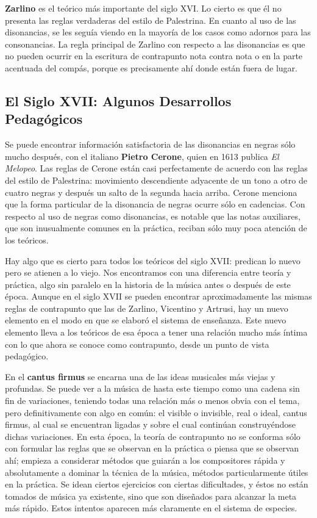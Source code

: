 \documentclass[letterpaper,12pt]{book}
\theoremstyle{definition} \newtheorem{Def}{Definición}[chapter]
\theoremstyle{definition} \newtheorem{Teo}{Teorema}[chapter]
\theoremstyle{definition} \newtheorem{Pro}{Proposición}[chapter]
\theoremstyle{definition} \newtheorem{Lema}{Lema}[chapter]
\begin{document}
\textbf{Zarlino} es el teórico más importante del siglo XVI. Lo cierto es que él no presenta las reglas verdaderas del estilo de Palestrina. En cuanto al uso de las disonancias, se les seguía viendo en la mayoría de los casos como adornos para las consonancias. La regla principal de Zarlino con respecto a las disonancias es que no pueden ocurrir en la escritura de contrapunto nota contra nota o en la parte acentuada del compás, porque es precisamente ahí donde están fuera de lugar.   
 
 \subsection{El Siglo XVII: Algunos Desarrollos Pedagógicos}
 
Se puede encontrar información satisfactoria de las disonancias en negras sólo mucho después, con el italiano \textbf{Pietro Cerone}, quien en 1613 publica \emph{El Melopeo}. Las reglas de Cerone están casi perfectamente de acuerdo con las reglas del estilo de Palestrina: movimiento descendiente adyacente de un tono a otro de cuatro negras y después un salto de la segunda hacia arriba. Cerone menciona que la forma particular de la disonancia de negras ocurre sólo en cadencias. Con respecto al uso de negras como disonancias, es notable que las notas auxiliares, que son inusualmente comunes en la práctica, reciban sólo muy poca atención de los teóricos.   

Hay algo que es cierto para todos los teóricos del siglo XVII: predican lo nuevo pero se atienen a lo viejo. Nos encontramos con una diferencia entre teoría y práctica, algo sin paralelo en la historia de la música antes o después de este época. Aunque en el siglo XVII se pueden encontrar aproximadamente las mismas reglas de contrapunto que las de Zarlino, Vicentino y Artrusi, hay un nuevo elemento en el modo en que se elaboró el sistema de enseñanza. Este nuevo elemento lleva a los teóricos de esa época a tener una relación mucho más íntima con lo que ahora se conoce como contrapunto, desde un punto de vista pedagógico.

En el \textbf{cantus firmus} se encarna una de las ideas musicales más viejas y profundas. Se puede ver a la música de hasta este tiempo como una cadena sin fin de variaciones, teniendo todas una relación más o menos obvia con el tema, pero definitivamente con algo en común: el visible o invisible, real o ideal, cantus firmus, al cual se encuentran ligadas y sobre el cual continúan construyéndose dichas variaciones. 
En esta época, la teoría de contrapunto no se conforma sólo con formular las reglas que se observan en la práctica o piensa que se observan ahí; empieza a considerar métodos que guiarán a los compositores rápida y absolutamente a dominar la técnica de la música, métodos particularmente útiles en la práctica. Se idean ciertos ejercicios con ciertas dificultades, y éstos no están tomados de música ya existente, sino que son diseñados para alcanzar la meta más rápido. Estos intentos aparecen más claramente en el sistema de especies.
\end{document}
